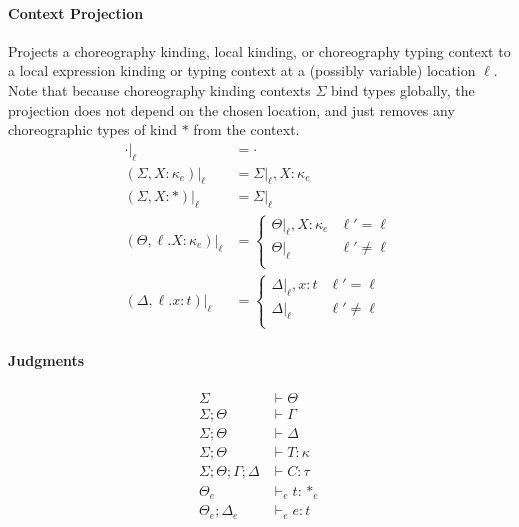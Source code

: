 \documentclass{article}
\theoremstyle{definition}
\newcommand\proj[2]{\ensuremath{\left.#1\right|_{#2}}}
\begin{document}
\paragraph{Context Projection}
Projects a choreography kinding, local kinding, or choreography typing context to a local expression kinding or typing context at a (possibly variable) location $\ell$. Note that because choreography kinding contexts $\Sigma$ bind types globally, the projection does not depend on the chosen location, and just removes any choreographic types of kind $*$ from the context.
\begin{align*}
	\proj{\cdot}{\ell} &= \cdot \\
	\proj{(\Sigma, X : \kappa_e)}{\ell} &= \proj{\Sigma}{\ell}, X : \kappa_e\\
	\proj{(\Sigma, X : *)}{\ell} &= \proj{\Sigma}{\ell}\\
	\proj{(\Theta, \ell.X : \kappa_e)}{\ell} &=
		\begin{cases} 
      		\proj{\Theta}{\ell}, X : \kappa_e & \ell' = \ell \\
      		\proj{\Theta}{\ell} & \ell' \neq \ell \\
   		\end{cases}\\
	\proj{(\Delta, \ell.x : t)}{\ell} &=
	\begin{cases} 
		\proj{\Delta}{\ell}, x : t & \ell' = \ell \\
		\proj{\Delta}{\ell} & \ell' \neq \ell \\
	\end{cases}
\end{align*}

\paragraph{Judgments}
\begin{align*}
	\Sigma &\vdash \Theta \tag{Local Kinding Context Well-Formedness}\\
	\Sigma;\Theta &\vdash \Gamma \tag{Choreography Typing Context Well-Formedness}\\
	\Sigma;\Theta &\vdash \Delta \tag{Local Typing Context Well-Formedness}\\
	\Sigma;\Theta &\vdash T : \kappa \tag{Kinding Judgment}\\
	\Sigma; \Theta; \Gamma; \Delta &\vdash C : \tau \tag{Choreography Typing Judgment}\\
	\Theta_e &\vdash_e t : *_e \tag{Local Type Kinding Judgment}\\
	\Theta_e;\Delta_e &\vdash_e e : t \tag{Local Expression Typing Judgment}
\end{align*}
\end{document}
